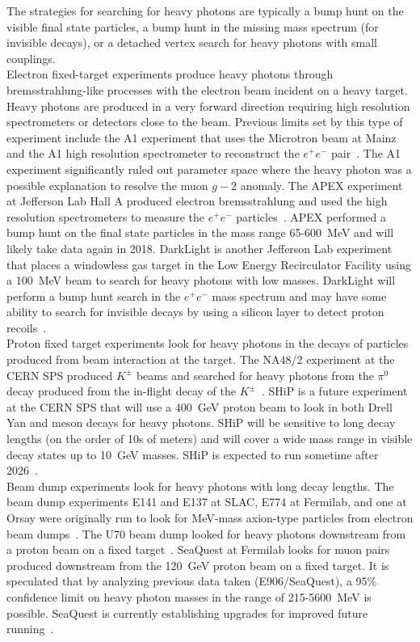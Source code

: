The strategies for searching for heavy photons are typically a bump hunt on the visible final state particles, a bump hunt in the missing mass spectrum (for invisible decays), or a detached vertex search for heavy photons with small couplings. \\
\indent Electron fixed-target experiments produce heavy photons through bremsstrahlung-like processes with the electron beam incident on a heavy target. Heavy photons are produced in a very forward direction requiring high resolution spectrometers or detectors close to the beam. Previous limits set by this type of experiment include the A1 experiment that uses the Microtron beam at Mainz and the A1 high resolution spectrometer to reconstruct the $e^+e^-$ pair~\cite{beranek_theoretical_2013}. The A1 experiment significantly ruled out parameter space where the heavy photon was a possible explanation to resolve the muon $g-2$ anomaly. The APEX experiment at Jefferson Lab Hall A produced electron bremsstrahlung and used the high resolution spectrometers to measure the $e^+e^-$ particles~\cite{abrahamyan_search_2011}. APEX performed a bump hunt on the final state particles in the mass range 65-600~MeV and will likely take data again in 2018. DarkLight is another Jefferson Lab experiment that places a windowless gas target in the Low Energy Recirculator Facility using a 100~MeV beam to search for heavy photons with low masses. DarkLight will perform a bump hunt search in the $e^+e^-$ mass spectrum and may have some ability to search for invisible decays by using a silicon layer to detect proton recoils~\cite{balewski_darklight_2014}.\\
\indent Proton fixed target experiments look for heavy photons in the decays of particles produced from beam interaction at the target. The NA48/2 experiment at the CERN SPS produced $K^{\pm}$ beams and searched for heavy photons from the $\pi^0$ decay produced from the in-flight decay of the $K^{\pm}$~\cite{Batley_2015lha}. SHiP is a future experiment at the CERN SPS that will use a 400~GeV proton beam to look in both Drell Yan and meson decays for heavy photons. SHiP will be sensitive to long decay lengths (on the order of 10s of meters) and will cover a wide mass range in visible decay states up to 10~GeV masses. SHiP is expected to run sometime after 2026~\cite{ship_collaboration_facility_2015}.\\
\indent Beam dump experiments look for heavy photons with long decay lengths. The beam dump experiments E141 and E137 at SLAC, E774 at Fermilab, and one at Orsay were originally run to look for MeV-mass axion-type particles from electron beam dumps~\cite{alexander_dark_2016}. The U70 beam dump looked for heavy photons downstream from a proton beam on a fixed target~\cite{Blumlein:2013cua}. SeaQuest at Fermilab looks for muon pairs produced downstream from the 120~GeV proton beam on a fixed target. It is speculated that by analyzing previous data taken (E906/SeaQuest), a 95$\%$ confidence limit on heavy photon masses in the range of 215-5600~MeV is possible. SeaQuest is currently establishing upgrades for improved future running~\cite{gardner_new_2016}.\\
